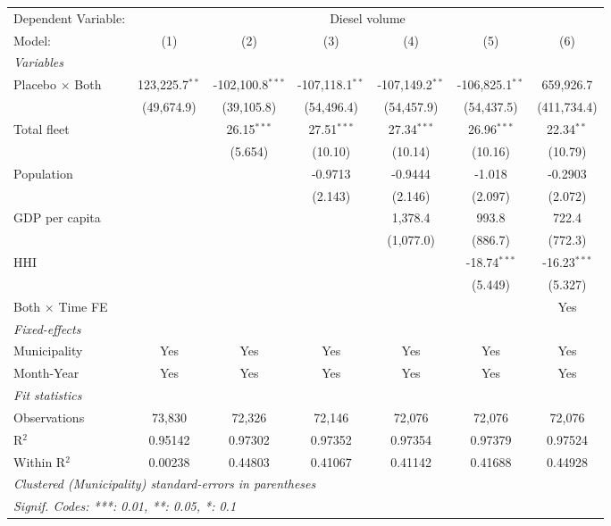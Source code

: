\documentclass[
]{article}
\begin{document}
\begin{tabular}{lcccccc}
\tabularnewline\midrule\midrule
Dependent Variable:&\multicolumn{6}{c}{Diesel volume}\\
Model:&(1) & (2) & (3) & (4) & (5) & (6)\\
\midrule \emph{Variables}&   &   &   &   &   &  \\
Placebo $\times $ Both & 123,225.7$^{**}$ & -102,100.8$^{***}$ & -107,118.1$^{**}$ & -107,149.2$^{**}$ & -106,825.1$^{**}$ & 659,926.7\\
  &(49,674.9) & (39,105.8) & (54,496.4) & (54,457.9) & (54,437.5) & (411,734.4)\\
Total fleet &    & 26.15$^{***}$ & 27.51$^{***}$ & 27.34$^{***}$ & 26.96$^{***}$ & 22.34$^{**}$\\
  &   & (5.654) & (10.10) & (10.14) & (10.16) & (10.79)\\
Population &    &    & -0.9713 & -0.9444 & -1.018 & -0.2903\\
  &   &    & (2.143) & (2.146) & (2.097) & (2.072)\\
GDP per capita &    &    &    & 1,378.4 & 993.8 & 722.4\\
  &   &    &    & (1,077.0) & (886.7) & (772.3)\\
HHI &    &    &    &    & -18.74$^{***}$ & -16.23$^{***}$\\
  &   &    &    &    & (5.449) & (5.327)\\
Both $\times$ Time FE &  &  &  &  &  & Yes\\
\midrule \emph{Fixed-effects}&   &   &   &   &   &  \\
Municipality & Yes & Yes & Yes & Yes & Yes & Yes\\
Month-Year & Yes & Yes & Yes & Yes & Yes & Yes\\
\midrule \emph{Fit statistics}&  & & & & & \\
Observations & 73,830&72,326&72,146&72,076&72,076&72,076\\
R$^2$ & 0.95142&0.97302&0.97352&0.97354&0.97379&0.97524\\
Within R$^2$ & 0.00238&0.44803&0.41067&0.41142&0.41688&0.44928\\
\midrule\midrule\multicolumn{7}{l}{\emph{Clustered (Municipality) standard-errors in parentheses}}\\
\multicolumn{7}{l}{\emph{Signif. Codes: ***: 0.01, **: 0.05, *: 0.1}}\\
\end{tabular}
\end{document}
